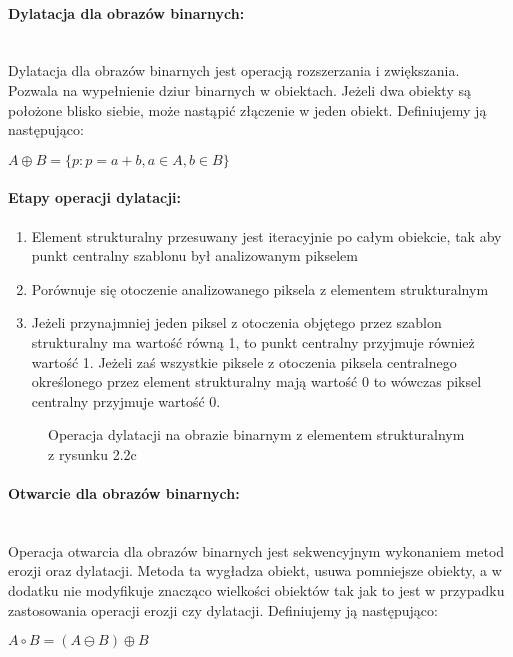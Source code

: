 \documentclass[a4paper,12pt,twoside,openany]{report}
\newcommand{\ImgPath}{.}
\begin{document}
\paragraph{Dylatacja dla obrazów binarnych:}\mbox{} \\
\indent Dylatacja dla obrazów binarnych jest operacją rozszerzania i zwiększania. Pozwala na wypełnienie dziur binarnych w obiektach. Jeżeli dwa obiekty są położone blisko siebie, może nastąpić złączenie w jeden obiekt. Definiujemy ją następująco: 
\begin{center}
	$ A \oplus B = \{p \colon p = a + b, a \in A, b \in B\} $ 
\end{center}

\paragraph{Etapy operacji dylatacji:}
\begin{enumerate}
	\item Element strukturalny przesuwany jest iteracyjnie po całym obiekcie, tak aby punkt centralny szablonu był analizowanym pikselem
	\item Porównuje się otoczenie analizowanego piksela z elementem strukturalnym
	\item Jeżeli przynajmniej jeden piksel z otoczenia objętego przez szablon strukturalny ma wartość równą 1, to punkt centralny przyjmuje również wartość 1. Jeżeli zaś wszystkie piksele z otoczenia piksela centralnego określonego przez element strukturalny mają wartość 0 to wówczas piksel centralny przyjmuje wartość 0.
\end{enumerate}

\begin{figure}[H]
	\centering
	\caption{Operacja dylatacji na obrazie binarnym z elementem strukturalnym z rysunku 2.2c}
\end{figure}

\paragraph{Otwarcie dla obrazów binarnych:}\mbox{} \\
\indent Operacja otwarcia dla obrazów binarnych jest sekwencyjnym wykonaniem metod erozji oraz dylatacji. Metoda ta wygładza obiekt, usuwa pomniejsze obiekty, a w dodatku nie modyfikuje znacząco wielkości obiektów tak jak to jest w przypadku zastosowania operacji erozji czy dylatacji. Definiujemy ją następująco:
\begin{center}
	$ A \circ B = (A \ominus B) \oplus B $ 
\end{center}
\end{document}
